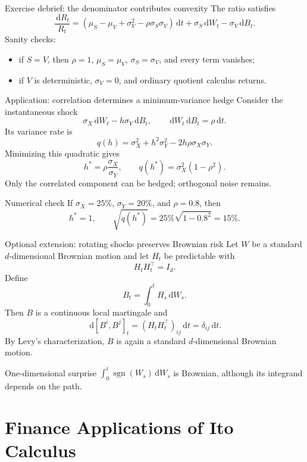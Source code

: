 \documentclass[handout,10pt,aspectratio=169]{beamer}
\newcommand{\dd}{\,\mathrm d}
\begin{document}
\begin{frame}{Exercise debrief: the denominator contributes convexity}
The ratio satisfies
\[
\boxed{
\frac{\dd R_t}{R_t}
=\left(
\mu_S-\mu_V+\sigma_V^2-\rho\sigma_S\sigma_V
\right)\dd t
+\sigma_S\dd W_t-\sigma_V\dd B_t.}
\]
Sanity checks:
\begin{itemize}
\item if \(S=V\), then \(\rho=1\), \(\mu_S=\mu_V\), \(\sigma_S=\sigma_V\), and every term vanishes;
\item if \(V\) is deterministic, \(\sigma_V=0\), and ordinary quotient calculus returns.
\end{itemize}
\end{frame}

\begin{frame}{Application: correlation determines a minimum-variance hedge}
Consider the instantaneous shock
\[
\sigma_X\dd W_t-h\sigma_Y\dd B_t,
\qquad \dd W_t\dd B_t=\rho\dd t.
\]
Its variance rate is
\[
q(h)=\sigma_X^2+h^2\sigma_Y^2-2h\rho\sigma_X\sigma_Y.
\]
Minimizing this quadratic gives
\[
\boxed{h^*=\rho\frac{\sigma_X}{\sigma_Y},
\qquad q(h^*)=\sigma_X^2(1-\rho^2).}
\]
Only the correlated component can be hedged; orthogonal noise remains.
\begin{block}{Numerical check}
If \(\sigma_X=25\%\), \(\sigma_Y=20\%\), and \(\rho=0.8\), then
\[
h^*=1,
\qquad
\sqrt{q(h^*)}=25\%\sqrt{1-0.8^2}=15\%.
\]
\end{block}
\end{frame}

\begin{frame}{Optional extension: rotating shocks preserves Brownian risk}
Let \(W\) be a standard \(d\)-dimensional Brownian motion and let \(H_t\) be predictable with
\[
H_tH_t^\top=I_d.
\]
Define
\[
B_t=\int_0^t H_s\dd W_s.
\]
Then \(B\) is a continuous local martingale and
\[
\dd[B^i,B^j]_t=(H_tH_t^\top)_{ij}\dd t=\delta_{ij}\dd t.
\]
By Levy's characterization, \(B\) is again a standard \(d\)-dimensional Brownian motion.
\begin{block}{One-dimensional surprise}
\(\int_0^t\operatorname{sgn}(W_s)\dd W_s\) is Brownian, although its integrand depends on the path.
\end{block}
\end{frame}

\section{Finance Applications of Ito Calculus}
\end{document}
